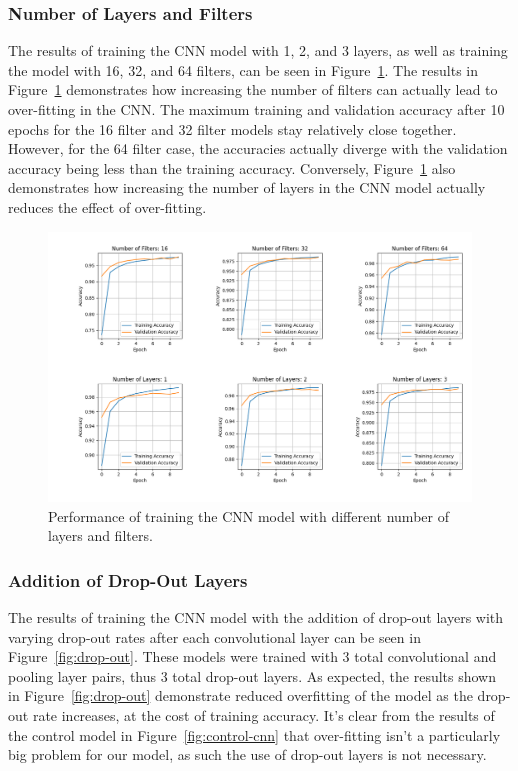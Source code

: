 \documentclass[a4paper]{article}
\begin{document}
\subsubsection{Number of Layers and Filters}

The results of training the CNN model with 1, 2, and 3 layers, as well as training the model with 16, 32, and 64 filters, can be seen in Figure~\ref{fig:layers-filters}. The results in Figure~\ref{fig:layers-filters} demonstrates how increasing the number of filters can actually lead to over-fitting in the CNN. The maximum training and validation accuracy after 10 epochs for the 16 filter and 32 filter models stay relatively close together. However, for the 64 filter case, the accuracies actually diverge with the validation accuracy being less than the training accuracy. Conversely, Figure~\ref{fig:layers-filters} also demonstrates how increasing the number of layers in the CNN model actually reduces the effect of over-fitting.

\begin{figure}[h]
    \centering
    \includegraphics[scale=0.45]{images/n-layers-n-filters-cnn.png}
    \caption{Performance of training the CNN model with different number of layers and filters.}
    \label{fig:layers-filters}
\end{figure}

\subsubsection{Addition of Drop-Out Layers}

The results of training the CNN model with the addition of drop-out layers with varying drop-out rates after each convolutional layer can be seen in Figure~\ref{fig:drop-out}. These models were trained with 3 total convolutional and pooling layer pairs, thus 3 total drop-out layers. As expected, the results shown in Figure~\ref{fig:drop-out} demonstrate reduced overfitting of the model as the drop-out rate increases, at the cost of training accuracy. It's clear from the results of the control model in Figure~\ref{fig:control-cnn} that over-fitting isn't a particularly big problem for our model, as such the use of drop-out layers is not necessary. 
\end{document}
